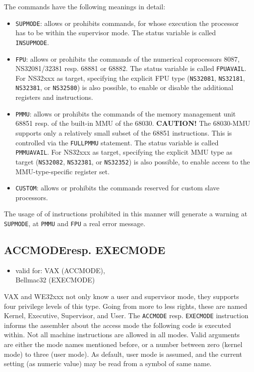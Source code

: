 \documentclass[12pt,twoside]{report}
\makeatletter
\newcommand{\bb}[1]{{\bf #1}}
\newcommand{\tty}[1]{{\tt #1}}
\newcommand{\ttindex}[1]{\index{#1@{\tt #1}}}
\makeatother
\begin{document}
The commands have the following meanings in detail:
\begin{itemize}
\item{\tty{SUPMODE}: allows or prohibits commands, for whose execution the
      processor has to be within the supervisor mode.  The status
      variable is called \tty{INSUPMODE}.}
\item{\tty{FPU}: allows or prohibits the commands of the numerical
      coprocessors 8087, NS32081/32381 resp. 68881 or 68882.  The status
      variable is called \tty{FPUAVAIL}.  For NS32xxx as target, specifying
      the explicit FPU type (\tty{NS32081}, \tty{NS32181}, \tty{NS32381},
      or \tty{NS32580}) is also possible, to enable or disable the additional
      registers and instructions.}
\item{\tty{PMMU}: allows or prohibits the commands of the memory
      management unit 68851 resp. of  the built-in MMU of the 68030.
      \bb{CAUTION!} The 68030-MMU supports only a relatively small subset
      of the 68851 instructions.  This is controlled via the \tty{FULLPMMU}
      statement. The status variable is called \tty{PMMUAVAIL}. For NS32xxx
      as target, specifying the explicit MMU type as target (\tty{NS32082},
      \tty{NS32381}, or \tty{NS32352}) is also possible, to enable access to
      the MMU-type-specific register set.}
\item{\tty{CUSTOM}: allows or prohibits the commands reserved for custom
      slave processors.}
\end{itemize}
The usage of of instructions prohibited in this manner will generate a
warning at \tty{SUPMODE}, at \tty{PMMU} and \tty{FPU} a real error
message.


\subsection{ACCMODEresp. EXECMODE}
\ttindex{ACCMODE}
\ttindex{EXECMODE}

{\em
\begin{itemize}
\item{valid for: VAX (ACCMODE),\\
      Bellmac32 (EXECMODE)}
\end{itemize}
}

VAX and WE32xxx not only know a user and supervisor mode, they supports four privilege
levels of this type.  Going from more to less rights, these are named Kernel,
Executive, Supervisor, and User.  The {\tt ACCMODE} resp. {\tt EXECMODE} instruction informs the
assembler about the access mode the following code is executed within.  Not
all machine instructions are allowed in all modes.  Valid arguments are either
the mode names mentioned before, or a number between zero (kernel mode) to
three (user mode).  As default, user mode is assumed, and the current setting
(as numeric value) may be read from a symbol of same name.
\end{document}
